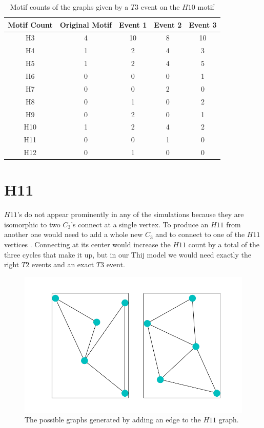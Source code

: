 \begin{table}
    \centering
    \begin{tabular}{||c c c c c||} 
    \hline
    Motif Count & Original Motif & Event 1 & Event 2 & Event 3 \\ [0.5ex] 
    \hline\hline
    H3 & 4 & 10 & 8 & 10 \\ 
    \hline
    H4 & 1 & 2 & 4 & 3 \\
    \hline
    H5 & 1 & 2 & 4 & 5\\
    \hline
    H6 & 0 & 0 & 0 & 1 \\
    \hline
    H7 & 0 & 0 & 2 & 0 \\
    \hline
    H8 & 0 & 1 & 0 & 2\\
    \hline
    H9 & 0 & 2 & 0 & 1\\
    \hline
    H10 & 1 & 2 & 4 & 2\\
    \hline
    H11 & 0 & 0 & 1 & 0\\
    \hline
    H12 & 0 & 1 & 0 & 0\\
    \hline
   \end{tabular}
   \caption{Motif counts of the graphs given by a $T3$ event on the $H10$ motif}
   \label{table:19}
\end{table}

\section{H11}
$H11$'s do not appear prominently in any of the simulations because they are isomorphic to
two $C_3$'s connect at a single vertex. To produce an $H11$ from another
one would need to add a whole new $C_3$ and to connect to one of the
 $H11$ vertices . Connecting at its center would increase the $H11$ count by a total 
of the three cycles that make it up, but in our Thij model we would need exactly 
the right $T2$ events and an exact $T3$ event.

\begin{figure}
    \includegraphics[width=12cm]{Images/H11_T3_evolution.png}
    \centering
    \caption{The possible graphs generated by adding an edge to the $H11$ graph.}
\end{figure}

